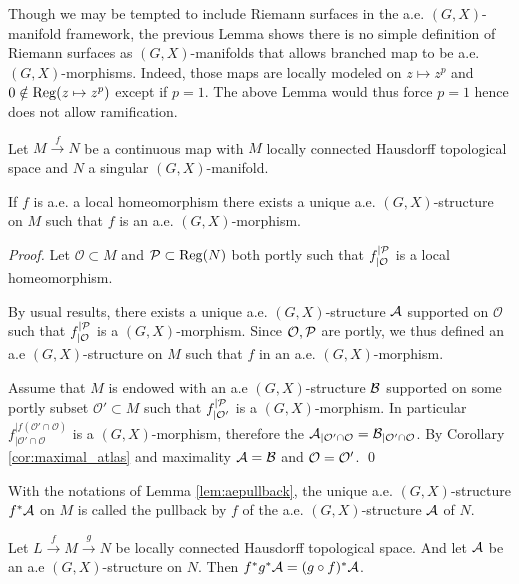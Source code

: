                 \begin{rem}\label{rem:though_may_tempted_include}
                 Though we may be tempted to include Riemann surfaces in the a.e. $(G,X)$-manifold framework, the previous Lemma shows there is no simple definition of Riemann surfaces as $(G,X)$-manifolds that allows branched map to be a.e. $(G,X)$-morphisms. Indeed, those maps are locally modeled on $z\mapsto z^p$ and $0\notin \reg(z\mapsto z^p)$ except if $p=1$. The above Lemma would thus force $p=1$ hence does not allow ramification.  
                \end{rem}
                \begin{lem}\label{lem:aepullback}
                    Let $M\xrightarrow{f} N$ be a continuous map with $M$ locally connected Hausdorff topological space and $N$ a singular $(G,X)$-manifold. 
                    
                    If $f$ is a.e. a local homeomorphism there exists a unique a.e. $(G,X)$-structure on $M$ such that $f$ is an a.e. $(G,X)$-morphism.
                \end{lem}
                \begin{proof} 
                 Let $\mathcal O\subset M$ and $\mathcal P\subset \reg(N)$  both portly such that $f_{|\mathcal O}^{|\P}$ is a local homeomorphism.
                 
                 By usual results, there exists a unique a.e. $(G,X)$-structure $\A$ supported on $\mathcal O$ such that $f_{|\mathcal O}^{|\P}$ is a $(G,X)$-morphism. 
                 Since $\mathcal O, \P$ are portly, we thus defined an a.e $(G,X)$-structure on $M$ such that $f$ in an a.e. $(G,X)$-morphism. 
                 
                 Assume that $M$ is endowed with an a.e $(G,X)$-structure $\B$ supported on some portly subset $\mathcal O'\subset M$ such that $f_{|\mathcal O'}^{|\P}$ is a $(G,X)$-morphism.  In particular $f_{|\mathcal O'\cap \mathcal O}^{|f(\mathcal O'\cap \mathcal O)}$ is a $(G,X)$-morphism, therefore the $\A_{|\mathcal O'\cap \mathcal O}=\B_{|\mathcal O'\cap \mathcal O}$. By Corollary \ref{cor:maximal_atlas} and maximality $\A=\B$ and $\O=\O'$.
                \qed\end{proof}
                \begin{defi}\label{def:notations_lemma_lem_aepullback}
                 With the notations of Lemma \ref{lem:aepullback}, the unique  a.e. $(G,X)$-structure $f^*\A$ on $M$ is called the pullback by $f$ of the a.e. $(G,X)$-structure $\A$ of $N$.
                 
                \end{defi}
                \begin{cor}\label{cor:locally_connected_hausdorff_topological}
                 Let $L\xrightarrow{f}M\xrightarrow{g} N$ be locally connected Hausdorff topological space. And let $\A$ be an a.e $(G,X)$-structure on $N$. 
                 Then $f^*g^*\A = (g\circ f)^*\A$.
                \end{cor}


